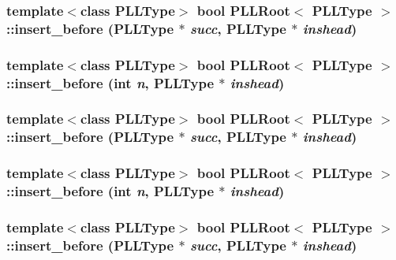 \subsubsection{\setlength{\rightskip}{0pt plus 5cm}template$<$class PLLType$>$ bool PLLRoot$<$ {\bf PLLType} $>$::insert\_\-before ({\bf PLLType} $\ast$ {\em succ}, {\bf PLLType} $\ast$ {\em inshead})\hspace{0.3cm}{\tt  [inline]}}\label{classPLLRoot_a65}


\subsubsection{\setlength{\rightskip}{0pt plus 5cm}template$<$class PLLType$>$ bool PLLRoot$<$ {\bf PLLType} $>$::insert\_\-before (int {\em n}, {\bf PLLType} $\ast$ {\em inshead})\hspace{0.3cm}{\tt  [inline]}}\label{classPLLRoot_a49}


\subsubsection{\setlength{\rightskip}{0pt plus 5cm}template$<$class PLLType$>$ bool PLLRoot$<$ {\bf PLLType} $>$::insert\_\-before ({\bf PLLType} $\ast$ {\em succ}, {\bf PLLType} $\ast$ {\em inshead})\hspace{0.3cm}{\tt  [inline]}}\label{classPLLRoot_a48}


\subsubsection{\setlength{\rightskip}{0pt plus 5cm}template$<$class PLLType$>$ bool PLLRoot$<$ {\bf PLLType} $>$::insert\_\-before (int {\em n}, {\bf PLLType} $\ast$ {\em inshead})\hspace{0.3cm}{\tt  [inline]}}\label{classPLLRoot_a32}


\subsubsection{\setlength{\rightskip}{0pt plus 5cm}template$<$class PLLType$>$ bool PLLRoot$<$ {\bf PLLType} $>$::insert\_\-before ({\bf PLLType} $\ast$ {\em succ}, {\bf PLLType} $\ast$ {\em inshead})\hspace{0.3cm}{\tt  [inline]}}\label{classPLLRoot_a31}


